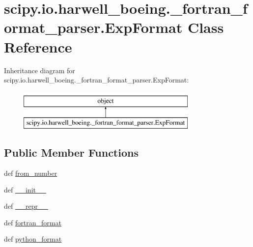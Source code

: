 \hypertarget{classscipy_1_1io_1_1harwell__boeing_1_1__fortran__format__parser_1_1ExpFormat}{}\section{scipy.\+io.\+harwell\+\_\+boeing.\+\_\+fortran\+\_\+format\+\_\+parser.\+Exp\+Format Class Reference}
\label{classscipy_1_1io_1_1harwell__boeing_1_1__fortran__format__parser_1_1ExpFormat}
Inheritance diagram for scipy.\+io.\+harwell\+\_\+boeing.\+\_\+fortran\+\_\+format\+\_\+parser.\+Exp\+Format\+:\begin{figure}[H]
\begin{center}
\leavevmode
\includegraphics[height=2.000000cm]{classscipy_1_1io_1_1harwell__boeing_1_1__fortran__format__parser_1_1ExpFormat}
\end{center}
\end{figure}
\subsection*{Public Member Functions}
\begin{DoxyCompactItemize}
\item 
def \hyperlink{classscipy_1_1io_1_1harwell__boeing_1_1__fortran__format__parser_1_1ExpFormat_a03f0e0e27a6f7aa88863459f2c806f1e}{from\+\_\+number}
\item 
def \hyperlink{classscipy_1_1io_1_1harwell__boeing_1_1__fortran__format__parser_1_1ExpFormat_a56d9a93f01e5109da1e8e4ac69a6e6ff}{\+\_\+\+\_\+init\+\_\+\+\_\+}
\item 
def \hyperlink{classscipy_1_1io_1_1harwell__boeing_1_1__fortran__format__parser_1_1ExpFormat_a6a8c4503555a46143186c5fa6bd2cb3c}{\+\_\+\+\_\+repr\+\_\+\+\_\+}
\item 
def \hyperlink{classscipy_1_1io_1_1harwell__boeing_1_1__fortran__format__parser_1_1ExpFormat_a648fb6fb53e053437a3462f25259e358}{fortran\+\_\+format}
\item 
def \hyperlink{classscipy_1_1io_1_1harwell__boeing_1_1__fortran__format__parser_1_1ExpFormat_a0b5eca7c4d38d70cd68157ca10abb568}{python\+\_\+format}
\end{DoxyCompactItemize}

